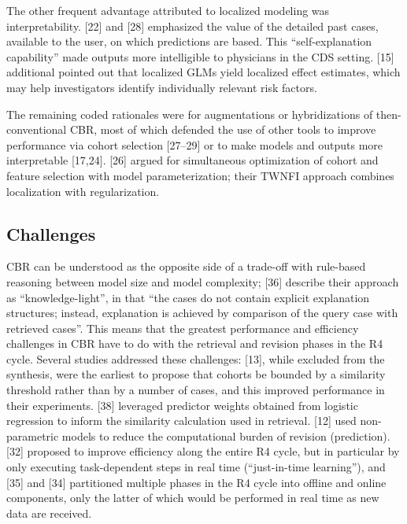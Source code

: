 \documentclass[preprint, 3p,
authoryear]{elsarticle} %
\begin{document}
The other frequent advantage attributed to localized modeling was
interpretability. {[}22{]} and {[}28{]} emphasized the value of the
detailed past cases, available to the user, on which predictions are
based. This ``self-explanation capability'' made outputs more
intelligible to physicians in the CDS setting. {[}15{]} additional
pointed out that localized GLMs yield localized effect estimates, which
may help investigators identify individually relevant risk factors.

The remaining coded rationales were for augmentations or hybridizations
of then-conventional CBR, most of which defended the use of other tools
to improve performance via cohort selection {[}27--29{]} or to make
models and outputs more interpretable {[}17,24{]}. {[}26{]} argued for
simultaneous optimization of cohort and feature selection with model
parameterization; their TWNFI approach combines localization with
regularization.

\hypertarget{challenges}{%
\subsection{Challenges}\label{challenges}}

CBR can be understood as the opposite side of a trade-off with
rule-based reasoning between model size and model complexity; {[}36{]}
describe their approach as ``knowledge-light'', in that ``the cases do
not contain explicit explanation structures; instead, explanation is
achieved by comparison of the query case with retrieved cases''. This
means that the greatest performance and efficiency challenges in CBR
have to do with the retrieval and revision phases in the R4 cycle.
Several studies addressed these challenges: {[}13{]}, while excluded
from the synthesis, were the earliest to propose that cohorts be bounded
by a similarity threshold rather than by a number of cases, and this
improved performance in their experiments. {[}38{]} leveraged predictor
weights obtained from logistic regression to inform the similarity
calculation used in retrieval. {[}12{]} used non-parametric models to
reduce the computational burden of revision (prediction). {[}32{]}
proposed to improve efficiency along the entire R4 cycle, but in
particular by only executing task-dependent steps in real time
(``just-in-time learning''), and {[}35{]} and {[}34{]} partitioned
multiple phases in the R4 cycle into offline and online components, only
the latter of which would be performed in real time as new data are
received.
\end{document}
